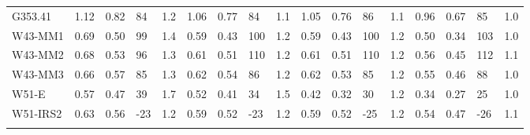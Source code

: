 \begin{table}
\begin{tabular}{@{\extracolsep{3pt}}lllllllllllllllll@{}}
G353.41  &   1.12&0.82&84&1.2&1.06&0.77&84&1.1&1.05&0.76&86&1.1&0.96&0.67&85&1.0 \\
W43-MM1  &   0.69&0.50&99&1.4&0.59&0.43&100&1.2&0.59&0.43&100&1.2&0.50&0.34&103&1.0 \\
W43-MM2  &   0.68&0.53&96&1.3&0.61&0.51&110&1.2&0.61&0.51&110&1.2&0.56&0.45&112&1.1 \\
W43-MM3  &   0.66&0.57&85&1.3&0.62&0.54&86&1.2&0.62&0.53&85&1.2&0.55&0.46&88&1.0 \\
W51-E  &  0.57&0.47&39&1.7&0.52&0.41&34&1.5&0.42&0.32&30&1.2&0.34&0.27&25&1.0 \\
W51-IRS2  &  0.63&0.56&-23&1.2&0.59&0.52&-23&1.2&0.59&0.52&-25&1.2&0.54&0.47&-26&1.1 \\
\hline \noalign {\smallskip}
\end{tabular}
\end{table}